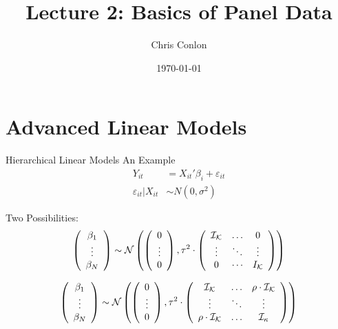 \documentclass[aspectratio=169]{beamer}
\title{Lecture 2: Basics of Panel Data}
\author{Chris Conlon }
\institute{NYU Stern }
\date{\today}
\begin{document}
\maketitle



\section{Advanced Linear Models}

\begin{frame}{Hierarchical Linear Models}
An Example
\begin{align*}
Y_{it} &= X_{it}'\beta_i + \varepsilon_{it}\\
\varepsilon_{it} | X_{it} &\sim N(0,\sigma^2)
\end{align*}

Two Possibilities:
\begin{align*}
\left( \begin{array} { c } { \beta _ { 1 } } \\ { \vdots } \\ { \beta _ { N } } \end{array} \right) \sim \mathcal { N } \left( \left( \begin{array} { c } { 0 } \\ { \vdots } \\ { 0 } \end{array} \right) , \tau ^ { 2 } \cdot 
\left( \begin{array} { c c c } { \mathcal { I } _ { \mathcal { K } } } & { \ldots } & { 0 } \\ { \vdots } & { \ddots } & { \vdots } \\ { 0 } & { \cdots } & { I _ { \mathcal { K } } } \end{array} 
\right) 
\right)
\end{align*}


\begin{align*}
\left( \begin{array} { c } { \beta _ { 1 } } \\ { \vdots } \\ { \beta _ { N } } \end{array} \right) \sim \mathcal { N } \left( \left( \begin{array} { c } { 0 } \\ { \vdots } \\ { 0 } \end{array} \right) , \tau ^ { 2 } \cdot 
\left( \begin{array} { c c c } { \mathcal { I } _ { \mathcal { K } } } & { \ldots } & { \rho \cdot \mathcal { I } _ { \mathcal { K } } } \\ { \vdots } & { \ddots } & { \vdots } \\ { \rho \cdot \mathcal { I } _ { \mathcal { K } } } & { \ldots } & { \mathcal { I } _ { \kappa } } \end{array} 
\right) \right)
\end{align*}



\end{frame}
\end{document}
